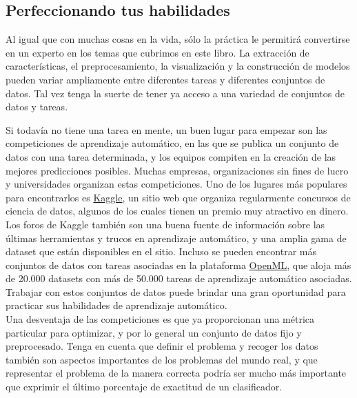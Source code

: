 \subsection{Perfeccionando tus habilidades}

Al igual que con muchas cosas en la vida, sólo la práctica le permitirá convertirse en un experto en los temas que cubrimos en este libro. La extracción de características, el preprocesamiento, la visualización y la construcción de modelos pueden variar ampliamente entre diferentes tareas y diferentes conjuntos de datos. Tal vez tenga la suerte de tener ya acceso a una variedad de conjuntos de datos y tareas. 
 
Si todavía no tiene una tarea en mente, un buen lugar para empezar son las competiciones de aprendizaje automático, en las que se publica un conjunto de datos con una tarea determinada, y los equipos compiten en la creación de las mejores predicciones posibles. Muchas empresas, organizaciones sin fines de lucro y universidades organizan estas competiciones. Uno de los lugares más populares para encontrarlos es  
 \href{https://www.kaggle.com/}{\textcolor{vino}{Kaggle}}, 
un sitio web que organiza regularmente concursos de ciencia de datos, algunos de los cuales tienen un premio muy atractivo en dinero.\\

Los foros de Kaggle también son una buena fuente de información sobre las últimas 
herramientas y trucos en aprendizaje automático, y una amplia gama de dataset que 
están disponibles en el sitio.
Incluso se pueden encontrar más conjuntos de datos con tareas asociadas en la plataforma
 \href{https://www.openml.org/}{\textcolor{vino}{OpenML}}, 
  que aloja más de 20.000 datasets
  con más de 50.000 tareas de aprendizaje automático asociadas. Trabajar con estos conjuntos 
  de datos puede brindar una gran oportunidad para practicar sus habilidades de
  aprendizaje automático.\\

 
 
  Una desventaja de las competiciones es que ya
  proporcionan una métrica particular para optimizar, y por lo general un conjunto de datos fijo y preprocesado. Tenga en cuenta que definir el problema y recoger los datos también son aspectos importantes de los problemas del mundo real, y que representar el problema de la manera
  correcta podría ser mucho más importante que exprimir el último porcentaje 
  de exactitud de un clasificador.













